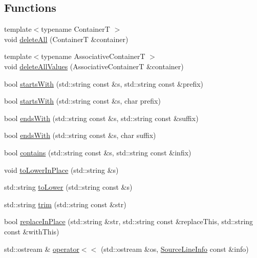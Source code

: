 \subsection*{Functions}
\begin{DoxyCompactItemize}
\item 
{\footnotesize template$<$typename Container\-T $>$ }\\void \hyperlink{namespace_catch_aadf9786550a462740ec355f8219863a9}{delete\-All} (Container\-T \&container)
\item 
{\footnotesize template$<$typename Associative\-Container\-T $>$ }\\void \hyperlink{namespace_catch_af2fcec1d4bd984fe19ff8b9a432c36a8}{delete\-All\-Values} (Associative\-Container\-T \&container)
\item 
bool \hyperlink{namespace_catch_a695f62327be0676e046291eeaae15110}{starts\-With} (std\-::string const \&s, std\-::string const \&prefix)
\item 
bool \hyperlink{namespace_catch_acad23751846ac23d0f379e34f5adebb1}{starts\-With} (std\-::string const \&s, char prefix)
\item 
bool \hyperlink{namespace_catch_ada025504f627feaf9ac68ca391515dff}{ends\-With} (std\-::string const \&s, std\-::string const \&suffix)
\item 
bool \hyperlink{namespace_catch_afd801a3e33fd7a8b91ded0d02747a93f}{ends\-With} (std\-::string const \&s, char suffix)
\item 
bool \hyperlink{namespace_catch_aa52974b0e426e7e2fbd725a900e9c36e}{contains} (std\-::string const \&s, std\-::string const \&infix)
\item 
void \hyperlink{namespace_catch_a0760dbe87d090a55a35414db57d272c4}{to\-Lower\-In\-Place} (std\-::string \&s)
\item 
std\-::string \hyperlink{namespace_catch_ac036a17412d318598ffda8e1fe7a1177}{to\-Lower} (std\-::string const \&s)
\item 
std\-::string \hyperlink{namespace_catch_a084108b47f37d8bfd5db51c50c7451b3}{trim} (std\-::string const \&str)
\item 
bool \hyperlink{namespace_catch_afe4e6770da547e43e9e4eeaa05f946ea}{replace\-In\-Place} (std\-::string \&str, std\-::string const \&replace\-This, std\-::string const \&with\-This)
\item 
std\-::ostream \& \hyperlink{namespace_catch_a6ec18b5054d7fdfdde861c580b082995}{operator$<$$<$} (std\-::ostream \&os, \hyperlink{struct_catch_1_1_source_line_info}{Source\-Line\-Info} const \&info)

\end{DoxyCompactItemize}
